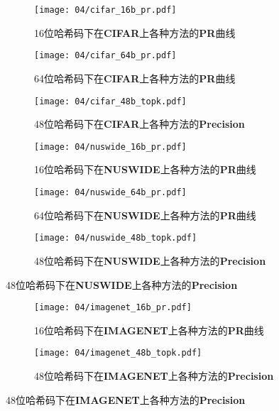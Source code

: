 \begin{figure}[!htp]
  \centering
  \begin{subfigure}{0.45\textwidth}
    \centering
    \texttt{[image: 04/cifar\_16b\_pr.pdf]}
    \caption{16位哈希码下在\textbf{CIFAR}上各种方法的\textbf{PR}曲线}
  \end{subfigure}
  \hspace{1cm}
  \begin{subfigure}{0.45\textwidth}
    \centering
    \texttt{[image: 04/cifar\_64b\_pr.pdf]}
    \caption{64位哈希码下在\textbf{CIFAR}上各种方法的\textbf{PR}曲线}
  \end{subfigure}
  \hspace{1cm}
  \begin{subfigure}{0.45\textwidth}
    \centering
    \texttt{[image: 04/cifar\_48b\_topk.pdf]}
    \caption{48位哈希码下在\textbf{CIFAR}上各种方法的\textbf{Precision}}
  \end{subfigure}
  \hspace{1cm}
  \begin{subfigure}{0.45\textwidth}
    \centering
    \texttt{[image: 04/nuswide\_16b\_pr.pdf]}
    \caption{16位哈希码下在\textbf{NUSWIDE}上各种方法的\textbf{PR}曲线}
  \end{subfigure}
  \hspace{1cm}
  \begin{subfigure}{0.45\textwidth}
    \centering
    \texttt{[image: 04/nuswide\_64b\_pr.pdf]}
    \caption{64位哈希码下在\textbf{NUSWIDE}上各种方法的\textbf{PR}曲线}
  \end{subfigure}
  \hspace{1cm}
  \begin{subfigure}{0.45\textwidth}
    \centering
    \texttt{[image: 04/nuswide\_48b\_topk.pdf]}
    \caption{48位哈希码下在\textbf{NUSWIDE}上各种方法的\textbf{Precision}}
  \end{subfigure}
\end{figure}
\begin{figure}[!htp]\ContinuedFloat
  \hspace{1cm}
  \begin{subfigure}{0.45\textwidth}
    \centering
    \texttt{[image: 04/imagenet\_16b\_pr.pdf]}
    \caption{16位哈希码下在\textbf{IMAGENET}上各种方法的\textbf{PR}曲线}
  \end{subfigure}
  \begin{subfigure}{0.45\textwidth}
    \centering
    \texttt{[image: 04/imagenet\_48b\_topk.pdf]}
    \caption{48位哈希码下在\textbf{IMAGENET}上各种方法的\textbf{Precision}}
  \end{subfigure}
  \label{fig:transhashresults}
\end{figure}



